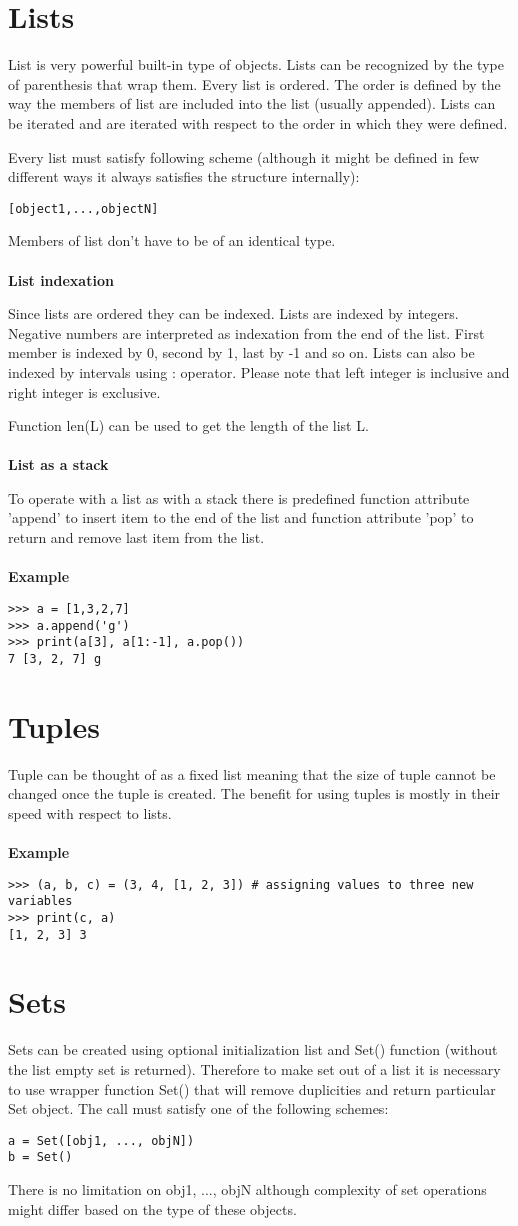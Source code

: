\documentclass[11pt,oneside]{fithesis2}
\newcommand{\markit}[1]{\ \\\\{\noindent\textbf{#1}}}
\begin{document}
\section{Lists}
List is very powerful built-in type of objects. Lists can be recognized by the type of parenthesis that wrap them. Every list is ordered. The order is defined by the way the members of list are included into the list (usually appended). Lists can be iterated and are iterated with respect to the order in which they were defined.

Every list must satisfy following scheme (although it might be defined in few different ways it always satisfies the structure internally):
\begin{lstlisting}
[object1,...,objectN]
\end{lstlisting}
Members of list don't have to be of an identical type.
\markit{List indexation}

Since lists are ordered they can be indexed. Lists are indexed by integers. Negative numbers are interpreted as indexation from the end of the list. First member is indexed by 0, second by 1, last by -1 and so on. Lists can also be indexed by intervals using : operator. Please note that left integer is inclusive and right integer is exclusive.

Function len(L) can be used to get the length of the list L.
\markit{List as a stack}

To operate with a list as with a stack there is predefined function attribute 'append' to insert item to the end of the list and function attribute 'pop' to return and remove last item from the list.
\markit{Example}
\begin{lstlisting}
>>> a = [1,3,2,7]
>>> a.append('g')
>>> print(a[3], a[1:-1], a.pop())
7 [3, 2, 7] g
\end{lstlisting}

\section{Tuples}
Tuple can be thought of as a fixed list meaning that the size of tuple cannot be changed once the tuple is created. The benefit for using tuples is mostly in their speed with respect to lists.
\markit{Example}
\begin{lstlisting}
>>> (a, b, c) = (3, 4, [1, 2, 3]) # assigning values to three new variables
>>> print(c, a)
[1, 2, 3] 3
\end{lstlisting}

\section{Sets}
Sets can be created using optional initialization list and Set() function (without the list empty set is returned). Therefore to make set out of a list it is necessary to use wrapper function Set() that will remove duplicities and return particular Set object. The call must satisfy one of the following schemes:
\begin{lstlisting}
a = Set([obj1, ..., objN])
b = Set()
\end{lstlisting}
There is no limitation on obj1, ..., objN although complexity of set operations might differ based on the type of these objects.
\end{document}
